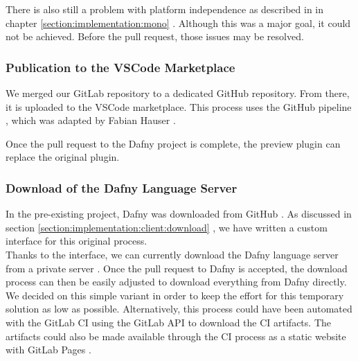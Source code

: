 There is also still a problem with platform independence as described in in chapter
\ref{section:implementation:mono} \textendash{} .
Although this was a major goal, it could not be achieved.
Before the pull request, those issues may be resolved.


\subsubsection{Publication to the VSCode Marketplace}
We merged our GitLab repository to a dedicated GitHub repository.
From there, it is uploaded to the VSCode marketplace.
This process uses the GitHub pipeline , which
was adapted by Fabian Hauser \cite{our-dafny-plugin-github-publish}.

Once the pull request to the Dafny project is complete,
the preview plugin can replace the original plugin.


\subsubsection{Download of the Dafny Language Server}
In the pre-existing project, Dafny was downloaded from GitHub \cite{dafny_lang_builds}.
As discussed in section \ref{section:implementation:client:download} \textendash{} ,
we have written a custom interface for this original process.\\

Thanks to the interface, we can currently download the Dafny language server from a private server \cite{client-serverStringResources}.
Once the pull request to Dafny is accepted, the download process can then be easily adjusted to download everything from Dafny directly.\\

We decided on this simple variant in order to keep the effort for this temporary solution as low as possible.
Alternatively, this process could have been automated with the GitLab CI using the GitLab API \cite{gitlab-api} to download the CI artifacts.
The artifacts could also be made available through the CI process as a static website with GitLab Pages \cite{gitlab-pages}. 



